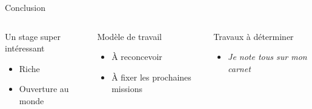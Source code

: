 \documentclass[A4,svgnames,9pt,aspectratio=169]{beamer}
\begin{document}
\begin{frame}{Conclusion}

  \begin{columns}
    \begin{column}{0.3\textwidth}
      \begin{block}{Un stage super intéressant}
        \begin{itemize}
          \item Riche
          \item Ouverture au monde
        \end{itemize}
      \end{block}
    \end{column}
    \pause
    \begin{column}{0.3\textwidth}
      \begin{block}{Modèle de travail}
        \begin{itemize}
          \item À reconcevoir
          \item À fixer les prochaines missions
        \end{itemize}
      \end{block}
    \end{column}
    \pause
    \begin{column}{0.3\textwidth}
      \begin{block}{Travaux à déterminer}
        \begin{itemize}
          \item \textit{\footnotesize Je note tous sur mon carnet}
        \end{itemize}
      \end{block}
    \end{column}
  \end{columns}

\end{frame}


\frame{\merci}
\end{document}
